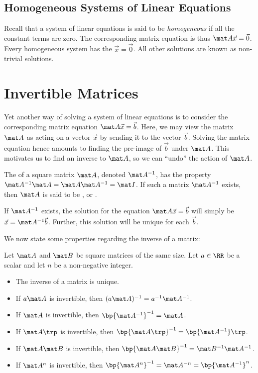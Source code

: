 \subsection{Homogeneous Systems of Linear Equations}

Recall that a system of linear equations is said to be \emph{homogeneous} if all the constant terms are zero. The corresponding matrix equation is thus $\mat A \vec x = \vec 0$. Every homogeneous system has the  $\vec x = \vec 0$. All other solutions are known as non-trivial solutions.

\section{Invertible Matrices}

Yet another way of solving a system of linear equations is to consider the corresponding matrix equation $\mat A \vec x = \vec b$. Here, we may view the matrix $\mat A$ as acting on a vector $\vec x$ by sending it to the vector $\vec b$. Solving the matrix equation hence amounts to finding the pre-image of $\vec b$ under $\mat A$. This motivates us to find an inverse to $\mat A$, so we can ``undo'' the action of $\mat A$.

\begin{definition}
    The  of a square matrix $\mat A$, denoted $\mat A^{-1}$, has the property $\mat A^{-1} \mat A = \mat A \mat A^{-1} = \mat I$. If such a matrix $\mat A^{-1}$ exists, then $\mat A$ is said to be , or .
\end{definition}

If $\mat A^{-1}$ exists, the solution for the equation $\mat A \vec x = \vec b$ will simply be $\vec x = \mat A^{-1} \vec b$. Further, this solution will be unique for each $\vec b$.

We now state some properties regarding the inverse of a matrix:

\begin{fact}
    Let $\mat A$ and $\mat B$ be square matrices of the same size. Let $a \in \RR$ be a scalar and let $n$ be a non-negative integer.
    \begin{itemize}
        \item The inverse of a matrix is unique.
        \item If $a\mat A$ is invertible, then $(a\mat A)^{-1} = a^{-1} \mat A^{-1}$.
        \item If $\mat A$ is invertible, then $\bp{\mat A^{-1}}^{-1} = \mat A$.
        \item If $\mat A \trp$ is invertible, then $\bp{\mat A \trp}^{-1} = \bp{\mat A^{-1}}\trp$.
        \item If $\mat A \mat B$ is invertible, then $\bp{\mat A \mat B}^{-1} = \mat B^{-1} \mat A^{-1}$.
        \item If $\mat A^n$ is invertible, then $\bp{\mat A^n}^{-1} = \mat A^{-n} = \bp{\mat A^{-1}}^n$.
    \end{itemize}
\end{fact}

